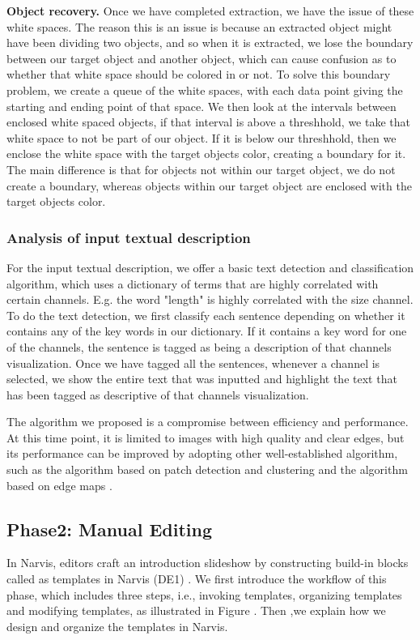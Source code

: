 \textbf{Object recovery.} Once we have completed extraction, we have the issue of these white spaces. The reason this is an issue is because an extracted object might have been dividing two objects, and so when it is extracted, we lose the boundary between our target object and another object, which can cause confusion as to whether that white space should be colored in or not. To solve this boundary problem, we create a queue of the white spaces, with each data point giving the starting and ending point of that space. We then look at the intervals between enclosed white spaced objects, if that interval is above a threshhold, we take that white space to not be part of our object. If it is below our threshhold, then we enclose the white space with the target objects color, creating a boundary for it. The main difference is that for objects not within our target object, we do not create a boundary, whereas objects within our target object are enclosed with the target objects color.

\subsubsection{Analysis of input textual description}
For the input textual description, we offer a basic text detection and classification algorithm, which uses a dictionary of terms that are highly correlated with certain channels. E.g. the word "length" is highly correlated with the size channel. To do the text detection, we first classify each sentence depending on whether it contains any of the key words in our dictionary. If it contains a key word for one of the channels, the sentence is tagged as being a description of that channels visualization. Once we have tagged all the sentences, whenever a channel is selected, we show the entire text that was inputted and highlight the text that has been tagged as descriptive of that channels visualization.

The algorithm we proposed is a compromise between efficiency and performance. At this time point, it is limited to images with high quality and clear edges, but its performance can be improved by adopting other well-established algorithm, such as the algorithm based on patch detection and clustering \cite{savva_revision:_2011} and the algorithm based on edge maps \cite{huang2003model}.




\subsection{Phase2: Manual Editing}
In Narvis, editors craft an introduction slideshow by constructing build-in blocks called as templates in Narvis (DE1) . We first introduce the workflow of this phase, which includes three steps, i.e., invoking templates, organizing templates and modifying templates, as illustrated in Figure . Then ,we explain how we design and organize the templates in Narvis. 

